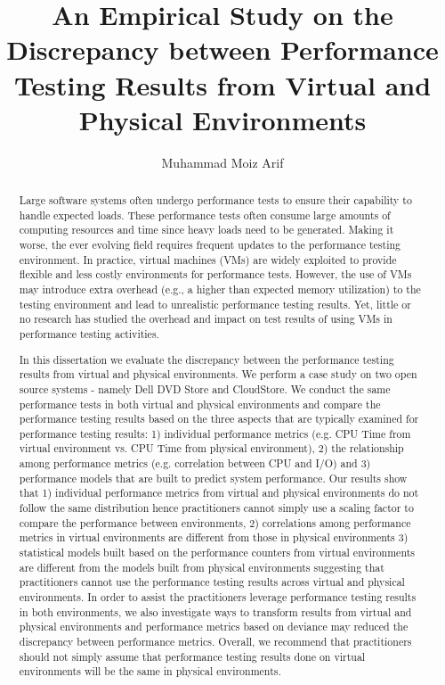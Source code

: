 \documentclass[12pt]{report}
\author{Muhammad Moiz Arif}
\title {An Empirical Study on the Discrepancy between Performance Testing Results from Virtual and Physical Environments}
\begin{document}
\begin{abstract}

Large software systems often undergo performance tests to ensure their capability to handle expected loads. These performance tests often consume large amounts of computing resources and time since heavy loads need to be generated. Making it worse, the ever evolving field requires frequent updates to the performance testing environment. In practice, virtual machines (VMs) are widely exploited to provide flexible and less costly environments for performance tests. However, the use of VMs may introduce extra overhead (e.g., a higher than expected memory utilization) to the testing environment and lead to unrealistic performance testing results. Yet, little or no research has studied the overhead and impact on test results of using VMs in performance testing activities. 

In this dissertation we evaluate the discrepancy between the performance testing results from virtual and physical environments. We perform a case study on two open source systems - namely Dell DVD Store and CloudStore. We conduct the same performance tests in both virtual and physical environments and compare the performance testing results based on the three aspects that are typically examined for performance testing results: 1) individual performance metrics (e.g. CPU Time from virtual environment vs. CPU Time from physical environment), 2) the relationship among performance metrics (e.g. correlation between CPU and I/O) and 3) performance models that are built to predict system performance. Our results show that 1) individual performance metrics from virtual and physical environments do not follow the same distribution hence practitioners cannot simply use a scaling factor to compare the performance between environments,  2) correlations among performance metrics in virtual environments are different from those in physical environments 3) statistical models built based on the performance counters from virtual environments are different from the models built from physical environments suggesting that practitioners cannot use the performance testing results across virtual and physical environments. In order to assist the practitioners leverage performance testing results in both environments, we also investigate ways to transform results from virtual and physical environments and performance metrics based on deviance may reduced the discrepancy between performance metrics. Overall, we recommend that practitioners should not simply assume that performance testing results done on virtual environments will be the same in physical environments.

\end{abstract}
\end{document}
